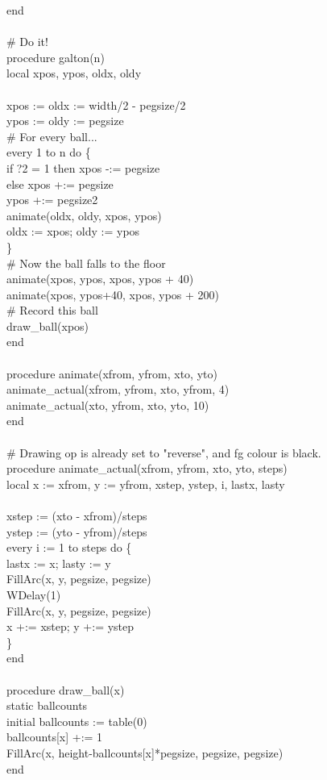 {end\\
\ \\
\# Do it! \\
procedure galton(n) \\
\>local xpos, ypos, oldx, oldy \\
\\
\>xpos := oldx := width/2 - pegsize/2 \\
\>ypos := oldy := pegsize \\
\>\# For every ball... \\
\>every 1 to n do \{ \\
\>\>if ?2 = 1 then xpos -:= pegsize \\
\>\>else xpos +:= pegsize \\
\>\>ypos +:= pegsize2 \\
\>\>animate(oldx, oldy, xpos, ypos) \\
\>\>oldx := xpos; oldy := ypos \\
\>\>\} \\
\>\# Now the ball falls to the floor \\
\>animate(xpos, ypos, xpos, ypos + 40) \\
\>animate(xpos, ypos+40, xpos, ypos + 200) \\
\>\# Record this ball \\
\>draw\_ball(xpos) \\
end\\
\ \\
procedure animate(xfrom, yfrom, xto, yto) \\
\>animate\_actual(xfrom, yfrom, xto, yfrom, 4) \\
\>animate\_actual(xto, yfrom, xto, yto, 10) \\
end\\
\ \\
\# Drawing op is already set to "reverse",
and fg colour is black. \\
procedure animate\_actual(xfrom, yfrom, xto, yto, steps) \\
\>local x := xfrom, y := yfrom, xstep, ystep, i, lastx, lasty \\
\\
\>xstep := (xto - xfrom)/steps \\
\>ystep := (yto - yfrom)/steps \\
\>every i := 1 to steps do \{ \\
\>\>lastx := x; lasty := y \\
\>\>FillArc(x, y, pegsize, pegsize) \\
\>\>WDelay(1) \\
\>\>FillArc(x, y, pegsize, pegsize) \\
\>\>x +:= xstep; y +:= ystep \\
\>\>\} \\
end\\
\ \\
procedure draw\_ball(x) \\
\>static ballcounts \\
\>initial ballcounts := table(0) \\
\>ballcounts[x] +:= 1 \\
\>FillArc(x, height-ballcounts[x]*pegsize, pegsize, pegsize) \\
end
}


